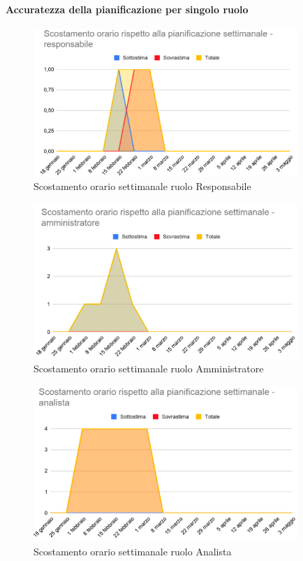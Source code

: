 		\paragraph{Accuratezza della pianificazione per singolo ruolo}
		\begin{figure}[H]
	\centering
	\includegraphics[width=10cm]{res/images/responsabile}
	\caption{Scostamento orario settimanale ruolo Responsabile}
	\label{fig:Scostamento orario settimanale ruolo Responsabile}
\end{figure}
\begin{figure}[H]
	\centering
	\includegraphics[width=10cm]{res/images/amministratore}
	\caption{Scostamento orario settimanale ruolo Amministratore}
	\label{fig:Scostamento orario settimanale ruolo Amministratore}
\end{figure}
\begin{figure}[H]
	\centering
	\includegraphics[width=10cm]{res/images/analista}
	\caption{Scostamento orario settimanale ruolo Analista}
	\label{fig:Scostamento orario settimanale ruolo Analista}
\end{figure}
